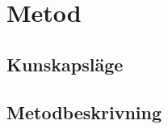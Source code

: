 \documentclass[11pt,a4paper,oneside]{book}
\begin{document}
\chapter{Metod}
\section{Kunskapsläge}



\section{Metodbeskrivning}

\newpage



\end{document}
